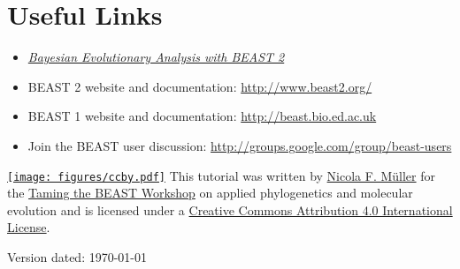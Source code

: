\documentclass[11pt]{article}
\begin{document}
\bigskip
\section{Useful Links}

\begin{itemize}
\item \href{http://www.beast2.org/book.html}{\textit{Bayesian Evolutionary Analysis with BEAST 2}}  \citep{BEAST2book2014}
\item BEAST 2 website and documentation: \href{http://www.beast2.org/}{http://www.beast2.org/} 
\item BEAST 1 website and documentation: \href{http://beast.bio.ed.ac.uk}{http://beast.bio.ed.ac.uk}
\item Join the BEAST user discussion: \href{http://groups.google.com/group/beast-users}{http://groups.google.com/group/beast-users} 
\end{itemize}


\href{http://creativecommons.org/licenses/by/4.0/}{\texttt{[image: figures/ccby.pdf]}} This tutorial was written by \href{https://www.bsse.ethz.ch/cevo/the-group/people/person-detail.html?persid=181412}{Nicola F. M\"{u}ller} for the \href{https://www.bsse.ethz.ch/cevo/taming-the-beast.html}{Taming the BEAST Workshop} on applied phylogenetics and molecular evolution and is licensed under a \href{http://creativecommons.org/licenses/by/4.0/}{Creative Commons Attribution 4.0 International License}. 



Version dated: \today



\newpage


\printbibliography[heading=relevref]
\end{document}
